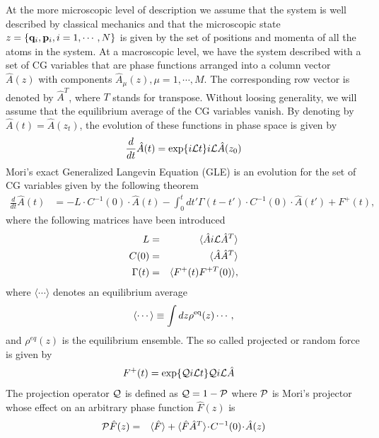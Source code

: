 \documentclass[a4paper,openright,12pt]{book}
\newcommand{\esc}{\!\cdot\!}
\begin{document}
At the more microscopic level of description we assume that the system is  well described  by classical  mechanics and  that the  microscopic state $z=\{{\bf q}_i,{\bf p}_i,i=1,\cdots,N\}$  is given by the set of positions  and momenta  of all  the atoms  in the  system.
At a macroscopic  level, we have  the system described with a  set of CG variables  that are phase functions arranged  into a column vector  $\hat{A}(z)$ with components $\hat{A}_\mu(z),\mu=1,\cdots,M$.   
The  corresponding  row  vector  is denoted  by  $\hat{A}^T$, where  $T$  stands  for transpose.   
Without loosing generality, we will assume that the equilibrium average of the CG variables  vanish.  
By  denoting by  $\hat{A}(t)=\hat{A}(z_t)$, the evolution of these functions in phase space is given by
\begin{eqnarray}
\frac{d}{dt}{\hat{A}}(t)=\exp\{i{\cal L}t\}i{\cal L}\hat{A}(z_0)
\label{LA}
\end{eqnarray}
Mori's  exact  Generalized Langevin  Equation  (GLE)  is an  evolution for the set of CG variables given by the following theorem
\begin{align}
\frac{d}{dt}\hat{A}(t) &= -L\esc C^{-1}(0)\esc \hat{A} (t)
-\int_0^tdt'\Gamma(t-t')\esc  C^{-1}(0)\esc \hat{A} (t') +F^+(t),
\label{exact}
\end{align}
where the following matrices have been introduced
\begin{eqnarray}
L&=&\langle \hat{A}i{\cal L}\hat{A}^T\rangle
\nonumber\\
C(0)&=&\langle \hat{A}\hat{A}^T\rangle
\nonumber\\
\Gamma(t)&=&\langle F^+(t)F^{+T}(0)\rangle,
\label{def}
\end{eqnarray}
where  $\langle\cdots \rangle$
denotes an equilibrium average
\begin{equation}
\langle\cdots\rangle\equiv \int dz\rho^{\rm eq}(z)\cdots,
\label{esc}
\end{equation}
and  $\rho^{eq}(z)$ is  the  equilibrium  ensemble.
The so called projected or random force is given by
\begin{align}
F^+(t)&= \exp\{{\cal Q}i{\cal L}t\} {\cal Q}i{\cal L}\hat{A}  
\label{Proj}
\end{align}
The projection operator ${\cal Q}$ is defined as ${\cal Q}=1-{\cal P}$
where  ${\cal P}$  is Mori's  projector whose  effect on  an arbitrary
phase function $\hat{F}(z)$ is
\begin{eqnarray}
  {\cal P}\hat{F}(z) &=& \langle \hat{F}\rangle+ \langle \hat{F}\hat{A}^T \rangle\esc  C^{-1}(0)\esc  \hat{A}(z)
\label{PM}
\end{eqnarray}
\end{document}
